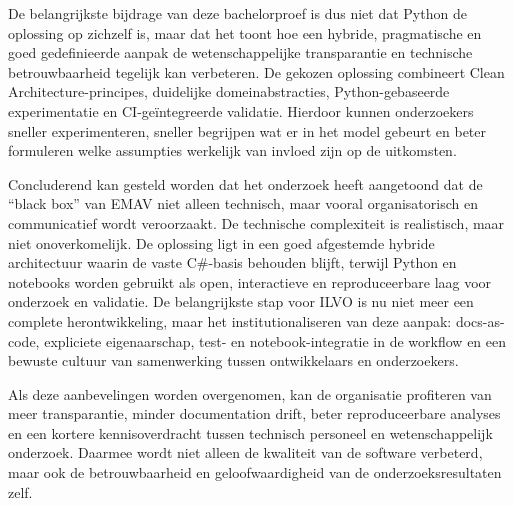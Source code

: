 De belangrijkste bijdrage van deze bachelorproef is dus niet dat Python de oplossing op zichzelf is, maar dat het toont hoe een hybride, pragmatische en goed gedefinieerde aanpak de wetenschappelijke transparantie en technische betrouwbaarheid tegelijk kan verbeteren. 
De gekozen oplossing combineert Clean Architecture-principes, duidelijke domeinabstracties, Python-gebaseerde experimentatie en CI-geïntegreerde validatie. 
Hierdoor kunnen onderzoekers sneller experimenteren, sneller begrijpen wat er in het model gebeurt en beter formuleren welke assumpties werkelijk van invloed zijn op de uitkomsten.

Concluderend kan gesteld worden dat het onderzoek heeft aangetoond dat de “black box” van EMAV niet alleen technisch, maar vooral organisatorisch en communicatief wordt veroorzaakt. 
De technische complexiteit is realistisch, maar niet onoverkomelijk. 
De oplossing ligt in een goed afgestemde hybride architectuur waarin de vaste C\#-basis behouden blijft, terwijl Python en notebooks worden gebruikt als open, interactieve en reproduceerbare laag voor onderzoek en validatie. 
De belangrijkste stap voor ILVO is nu niet meer een complete herontwikkeling, maar het institutionaliseren van deze aanpak: docs-as-code, expliciete eigenaarschap, test- en notebook-integratie in de workflow en een bewuste cultuur van samenwerking tussen ontwikkelaars en onderzoekers.

Als deze aanbevelingen worden overgenomen, kan de organisatie profiteren van meer transparantie, minder documentation drift, beter reproduceerbare analyses en een kortere kennisoverdracht tussen technisch personeel en wetenschappelijk onderzoek. 
Daarmee wordt niet alleen de kwaliteit van de software verbeterd, maar ook de betrouwbaarheid en geloofwaardigheid van de onderzoeksresultaten zelf.

